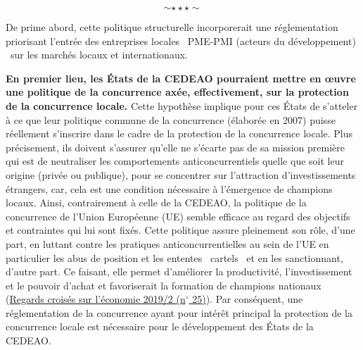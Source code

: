 	$$\sim\star\star\star\sim$$
	
	
	\hspace*{.5cm}De prime abord, cette politique structurelle incorporerait une réglementation priorisant l'entrée des entreprises locales \textendash\ PME-PMI (acteurs du développement) \textendash\ sur les marchés locaux et internationaux.
	
	\hspace*{0.5cm}\textbf{En premier lieu, les \'Etats de la CEDEAO pourraient mettre en \oe uvre une politique de la concurrence axée, effectivement, sur la protection de la concurrence locale.} Cette hypothèse implique pour ces \'Etats de s'atteler à ce que leur politique commune de la concurrence (élaborée en 2007) puisse réellement s'inscrire dans le cadre de la protection de la concurrence locale. Plus précisement, ils doivent s'assurer qu'elle ne s'écarte pas de sa mission première qui est de neutraliser les comportements anticoncurrentiels quelle que soit leur origine (privée ou publique), pour se concentrer sur l'attraction d'investissements étrangers, car, cela est une condition nécessaire à l'émergence de champions locaux. Ainsi, contrairement  à celle de la CEDEAO, la politique de la concurrence de l'Union Européenne (UE) semble efficace au regard des objectifs et contraintes qui lui sont fixés. Cette politique assure pleinement son rôle, d'une part, en luttant contre les pratiques anticoncurrentielles au sein de l'UE en particulier les abus de position et les ententes \textendash\ cartels \textendash\ et en les sanctionnant, d'autre part. Ce faisant, elle permet d'améliorer la productivité, l'investissement et le pouvoir d'achat et favoriserait la formation de champions nationaux (\underline{Regards croisés sur l'économie 2019/2 (n$^\circ$ 25)}). Par conséquent, une réglementation de la concurrence ayant pour intérêt principal la protection de la concurrence locale est nécessaire pour le développement des \'Etats de la CEDEAO.
	
